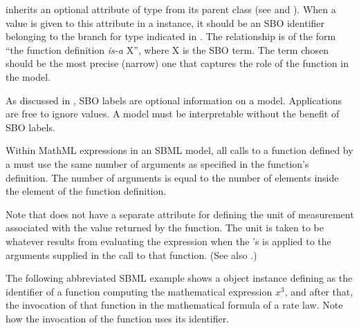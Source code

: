 \label{sec:functiondefinition-sboterm}

\FunctionDefinition inherits an optional 
attribute of type  from its parent
class \SBase (see 
and ).  When a value is given to this
attribute in a \FunctionDefinition instance, it should be an
SBO identifier belonging to the branch for type \FunctionDefinition 
indicated in .  The relationship is
of the form ``the function definition \emph{is-a} X'', where X is
the SBO term.  The term chosen should be the most precise (narrow)
one that captures the role of the function in the model.

As discussed in , SBO labels are optional
information on a model.  Applications are free to ignore
 values.  A model must be interpretable without the
benefit of SBO labels.


\label{sec:functiondefinition-calling}

Within MathML expressions in an SBML model, all calls to a
function defined by a \FunctionDefinition must use the same number
of arguments as specified in the function's definition.  The
number of arguments is equal to the number of 
elements inside the  element of the function
definition.  

Note that \FunctionDefinition does not have a separate attribute
for defining the unit of measurement associated with the value
returned by the function.  The unit is taken to be whatever
results from evaluating the expression when the
\FunctionDefinition's  is applied to the arguments
supplied in the call to that function.  (See also
.)



The following abbreviated SBML example shows a \FunctionDefinition
object instance defining  as the identifier of a function
computing the mathematical expression $x^{3}$, and after that, the
invocation of that function in the mathematical formula of a rate
law.  Note how the invocation of the function uses its identifier.

